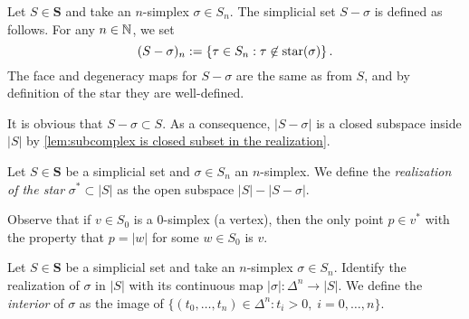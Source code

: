 \begin{definition}
\label{def:simplicial set minus a simplex}
Let $S \in \mathbf{S}$ and take an $n$-simplex $\sigma \in S_n$. The simplicial set $S - \sigma$ is defined as follows. For any $n \in \mathbb{N}$, we set
\[ (S-\sigma)_n := \left\{ \tau \in S_n : \tau \not\in \operatorname{star}(\sigma) \right\}. \]
The face and degeneracy maps for $S-\sigma$ are the same as from $S$, and by definition of the star they are well-defined.
\end{definition}

It is obvious that $S - \sigma \subset S$. As a consequence, $|S-\sigma|$ is a closed subspace inside $|S|$ by \cref{lem:subcomplex is closed subset in the realization}.

\begin{definition}
\label{def:realization of the star}
Let $S \in \mathbf{S}$ be a simplicial set and $\sigma \in S_n$ an $n$-simplex. We define the \emph{realization of the star} $\sigma^* \subset |S|$ as the open subspace $|S| - |S-\sigma|$.
\end{definition}
Observe that if $v \in S_0$ is a $0$-simplex (a vertex), then the only point $p \in v^*$ with the property that $p = |w|$ for some $w \in S_0$ is $v$.


\begin{definition}
\label{def:interior of a simplex}
Let $S \in \mathbf{S}$ be a simplicial set and take an $n$-simplex $\sigma \in S_n$. Identify the realization of $\sigma$ in $|S|$ with its continuous map $|\sigma| : \Delta^n \to |S|$. We define the \emph{interior} of $\sigma$ as the image of $\{(t_0,\ldots,t_n) \in \Delta^n : t_i > 0,\; i=0,\ldots,n\}$.
\end{definition}

